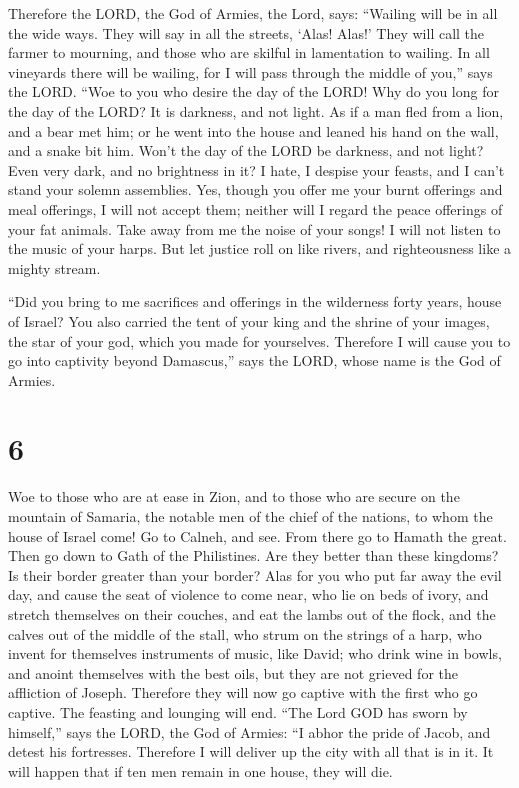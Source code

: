  Therefore the LORD, the God of Armies, the Lord, says:
``Wailing will be in all the wide ways. They will say in all the
streets, `Alas! Alas!' They will call the farmer to mourning, and those
who are skilful in lamentation to wailing.  In all
vineyards there will be wailing, for I will pass through the middle of
you,'' says the LORD.  ``Woe to you who desire the day of
the LORD! Why do you long for the day of the LORD? It is darkness, and
not light.  As if a man fled from a lion, and a bear met
him; or he went into the house and leaned his hand on the wall, and a
snake bit him.  Won't the day of the LORD be darkness, and
not light? Even very dark, and no brightness in it?  I
hate, I despise your feasts, and I can't stand your solemn assemblies.
 Yes, though you offer me your burnt offerings and meal
offerings, I will not accept them; neither will I regard the peace
offerings of your fat animals.  Take away from me the noise
of your songs! I will not listen to the music of your harps.
 But let justice roll on like rivers, and righteousness
like a mighty stream.

 ``Did you bring to me sacrifices and offerings in the
wilderness forty years, house of Israel?  You also carried
the tent of your king and the shrine of your images, the star of your
god, which you made for yourselves.  Therefore I will cause
you to go into captivity beyond Damascus,'' says the LORD, whose name is
the God of Armies.

\hypertarget{section-5}{%
\section{6}\label{section-5}}

 Woe to those who are at ease in Zion, and to those who are
secure on the mountain of Samaria, the notable men of the chief of the
nations, to whom the house of Israel come!  Go to Calneh,
and see. From there go to Hamath the great. Then go down to Gath of the
Philistines. Are they better than these kingdoms? Is their border
greater than your border?  Alas for you who put far away the
evil day, and cause the seat of violence to come near,  who
lie on beds of ivory, and stretch themselves on their couches, and eat
the lambs out of the flock, and the calves out of the middle of the
stall,  who strum on the strings of a harp, who invent for
themselves instruments of music, like David;  who drink wine
in bowls, and anoint themselves with the best oils, but they are not
grieved for the affliction of Joseph.  Therefore they will
now go captive with the first who go captive. The feasting and lounging
will end.  ``The Lord GOD has sworn by himself,'' says the
LORD, the God of Armies: ``I abhor the pride of Jacob, and detest his
fortresses. Therefore I will deliver up the city with all that is in it.
 It will happen that if ten men remain in one house, they
will die.

